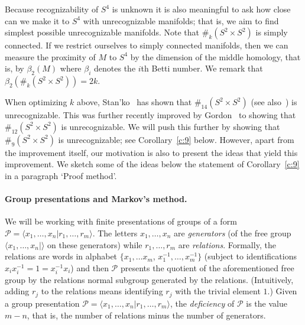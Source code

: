 \documentclass[10pt,a4paper]{article}
\theoremstyle{definition}
\theoremstyle{remark}
\newcommand\PP{\mathcal{P}}
\begin{document}
Because recognizability of $S^4$ is unknown it is also meaningful to ask how
close can we make it to $S^4$ with unrecognizable manifolds; that is, we aim to
find simplest possible unrecognizable manifolds. Note that $\#_k(S^2 \times
S^2)$ is simply connected. If we restrict ourselves to simply connected
manifolds, then we can measure the proximity of $M$ to $S^4$ by the dimension
of the middle homology, that is, by $\beta_2(M)$ where $\beta_i$ denotes the
$i$th Betti number. We remark that $\beta_2(\#_k (S^2 \times S^2)) = 2k$.

When optimizing $k$ above, Stan'ko~\cite{stanko05} has shown that $\#_{14} (S^2
\times S^2)$ (see also~\cite{chernavsky-leksine06}) is unrecognizable. This was
further recently improved by Gordon~\cite{gordon21} to showing that $\#_{12}
(S^2 \times S^2)$ is unrecognizable. We will push this further by showing that
$\#_9 (S^2 \times S^2)$ is unrecognizable; see Corollary~\ref{c:9} below. 
However, apart from the improvement itself, our motivation is also to present
the ideas that yield this improvement. We sketch some of the ideas below the
statement of Corollary~\ref{c:9} in a paragraph `Proof method'.





\paragraph{Group presentations and Markov's method.}
We will be working with finite presentations of groups of a form
$\PP = \langle x_1, \dots, x_n | r_1, \dots, r_m \rangle$. The letters $x_1,
\dots, x_n$ are \emph{generators} (of the free group $\langle x_1, \dots, x_n
| \rangle$ on these generators) while
$r_1, \dots, r_m$ are \emph{relations}. Formally, the relations are words in
alphabet $\{x_1, \dots x_m$, $x_1^{-1}, \dots, x_m^{-1}\}$ (subject to
identifications $x_ix_i^{-1} = 1 = x_i^{-1}x_i$) and then $\PP$ presents
the quotient of the aforementioned free group by the relations normal subgroup
generated by the relations. (Intuitively, adding $r_j$ to the relations means
identifying $r_j$ with the trivial element $1$.) Given a group presentation
$\PP
= \langle x_1, \dots, x_n | r_1, \dots, r_m
\rangle$, the \emph{deficiency} of $\PP$ is the value $m - n$, that is, the
number of relations minus the number of generators.
\end{document}
